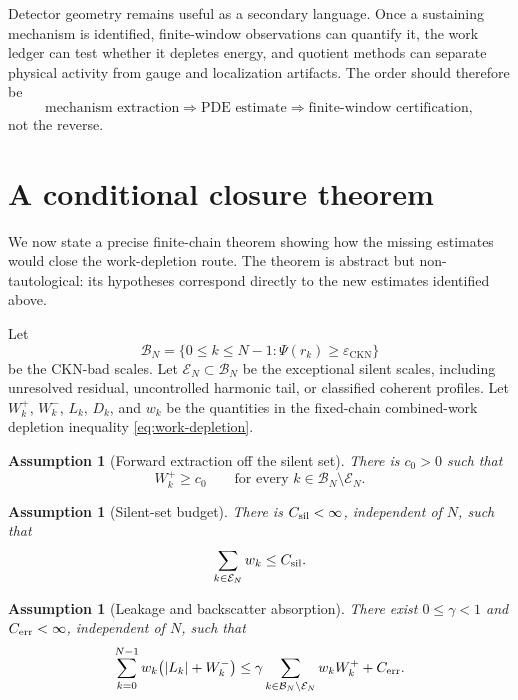 \documentclass[11pt]{article}
\numberwithin{equation}{section}
\newtheorem{assumption}[theorem]{Assumption}
\theoremstyle{remark}
\newcommand{\eps}{\varepsilon}
\newcommand{\CKN}{\mathrm{CKN}}
\newcommand{\calB}{\mathcal B}
\newcommand{\calE}{\mathcal E}
\begin{document}
Detector geometry remains useful as a secondary language. Once a sustaining mechanism is identified, finite-window observations can quantify it, the work ledger can test whether it depletes energy, and quotient methods can separate physical activity from gauge and localization artifacts. The order should therefore be
\begin{equation}\label{eq:new-order}
\text{mechanism extraction}
\Longrightarrow
\text{PDE estimate}
\Longrightarrow
\text{finite-window certification},
\end{equation}
not the reverse.

\section{A conditional closure theorem}\label{sec:conditional-closure}

We now state a precise finite-chain theorem showing how the missing estimates would close the work-depletion route. The theorem is abstract but non-tautological: its hypotheses correspond directly to the new estimates identified above.

Let
\[
\calB_N=\{0\le k\le N-1:\Psi(r_k)\ge\eps_{\CKN}\}
\]
be the CKN-bad scales. Let $\calE_N\subset\calB_N$ be the exceptional silent scales, including unresolved residual, uncontrolled harmonic tail, or classified coherent profiles. Let $W_k^+$, $W_k^-$, $L_k$, $D_k$, and $w_k$ be the quantities in the fixed-chain combined-work depletion inequality \eqref{eq:work-depletion}.

\begin{assumption}[Forward extraction off the silent set]\label{ass:forward-extraction}
There is $c_0>0$ such that
\begin{equation}\label{eq:forward-extraction}
W_k^+\ge c_0
\qquad
\text{for every }k\in\calB_N\setminus\calE_N.
\end{equation}
\end{assumption}

\begin{assumption}[Silent-set budget]\label{ass:silent-budget}
There is $C_{\rm sil}<\infty$, independent of $N$, such that
\begin{equation}\label{eq:silent-budget}
\sum_{k\in\calE_N}w_k\le C_{\rm sil}.
\end{equation}
\end{assumption}

\begin{assumption}[Leakage and backscatter absorption]\label{ass:absorption}
There exist $0\le\gamma<1$ and $C_{\rm err}<\infty$, independent of $N$, such that
\begin{equation}\label{eq:absorption}
\sum_{k=0}^{N-1}w_k\bigl(|L_k|+W_k^-\bigr)
\le
\gamma\sum_{k\in\calB_N\setminus\calE_N}w_kW_k^+
+C_{\rm err}.
\end{equation}
\end{assumption}
\end{document}
